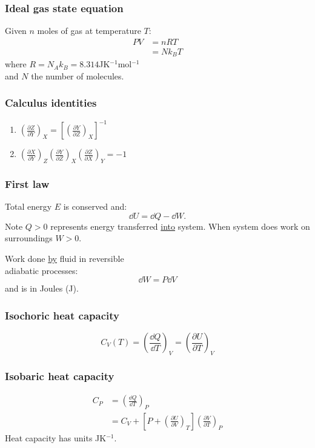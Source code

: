 \documentclass{article}
\begin{document}
\begin{multicols*}{3}
\subsubsection*{Ideal gas state equation}
Given $n$ moles of gas at temperature $T$:
\begin{align*}
    PV&=nRT \\
    &=Nk_B T
\end{align*}
where $R=N_A k_B=8.314$JK$^{-1}$mol$^{-1}$ \\
and $N$ the number of molecules.

\subsubsection*{Calculus identities}
\begin{enumerate}
    \item $\displaystyle
    \left(\frac{\partial Z}{\partial Y}\right)_X
    =\left[\left(\frac{\partial Y}{\partial Z}\right)_X
    \right]^{-1}$

    \item $\displaystyle
    \left(\frac{\partial X}{\partial Y}\right)_Z
    \left(\frac{\partial Y}{\partial Z}\right)_X
    \left(\frac{\partial Z}{\partial X}\right)_Y
    =-1$
\end{enumerate}

\subsubsection*{First law}
Total energy $E$ is conserved and:
$$\dd U=\dd Q-\dd W.$$
Note $Q>0$ represents energy transferred
\underline{into} system.
When system does work on surroundings $W>0$.

Work done \underline{by} fluid
in reversible \\
adiabatic processes:
$$\dd W=P\dd V$$
and is in Joules (J).

\subsubsection*{Isochoric heat capacity}
$$C_V(T)=\left(\frac{\dd Q}{\dd T}\right)_V
=\left(\frac{\partial U}{\partial T}\right)_V$$

\subsubsection*{Isobaric heat capacity}
\begin{align*}
    C_P
    &=\left(\frac{\dd Q}{\dd T}\right)_P \\
    &=C_V+\left[P+
    \left(\frac{\partial U}{\partial V}\right)_T\right]
    \left(\frac{\partial V}{\partial T}\right)_P
\end{align*}
Heat capacity has units JK$^{-1}$.


\end{multicols*}
\end{document}
